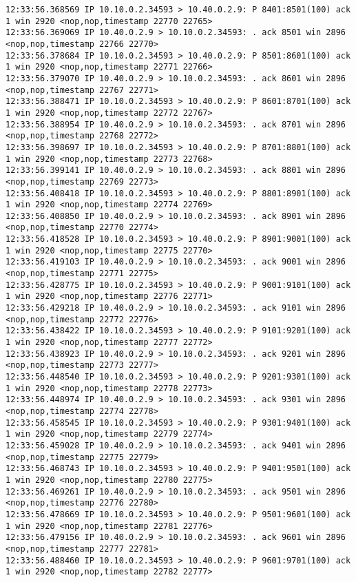 \documentclass[a4paper,12pt]{article}
\begin{document}
\begin{lstlisting}
12:33:56.368569 IP 10.10.0.2.34593 > 10.40.0.2.9: P 8401:8501(100) ack 1 win 2920 <nop,nop,timestamp 22770 22765>
12:33:56.369069 IP 10.40.0.2.9 > 10.10.0.2.34593: . ack 8501 win 2896 <nop,nop,timestamp 22766 22770>
12:33:56.378684 IP 10.10.0.2.34593 > 10.40.0.2.9: P 8501:8601(100) ack 1 win 2920 <nop,nop,timestamp 22771 22766>
12:33:56.379070 IP 10.40.0.2.9 > 10.10.0.2.34593: . ack 8601 win 2896 <nop,nop,timestamp 22767 22771>
12:33:56.388471 IP 10.10.0.2.34593 > 10.40.0.2.9: P 8601:8701(100) ack 1 win 2920 <nop,nop,timestamp 22772 22767>
12:33:56.388954 IP 10.40.0.2.9 > 10.10.0.2.34593: . ack 8701 win 2896 <nop,nop,timestamp 22768 22772>
12:33:56.398697 IP 10.10.0.2.34593 > 10.40.0.2.9: P 8701:8801(100) ack 1 win 2920 <nop,nop,timestamp 22773 22768>
12:33:56.399141 IP 10.40.0.2.9 > 10.10.0.2.34593: . ack 8801 win 2896 <nop,nop,timestamp 22769 22773>
12:33:56.408418 IP 10.10.0.2.34593 > 10.40.0.2.9: P 8801:8901(100) ack 1 win 2920 <nop,nop,timestamp 22774 22769>
12:33:56.408850 IP 10.40.0.2.9 > 10.10.0.2.34593: . ack 8901 win 2896 <nop,nop,timestamp 22770 22774>
12:33:56.418528 IP 10.10.0.2.34593 > 10.40.0.2.9: P 8901:9001(100) ack 1 win 2920 <nop,nop,timestamp 22775 22770>
12:33:56.419103 IP 10.40.0.2.9 > 10.10.0.2.34593: . ack 9001 win 2896 <nop,nop,timestamp 22771 22775>
12:33:56.428775 IP 10.10.0.2.34593 > 10.40.0.2.9: P 9001:9101(100) ack 1 win 2920 <nop,nop,timestamp 22776 22771>
12:33:56.429218 IP 10.40.0.2.9 > 10.10.0.2.34593: . ack 9101 win 2896 <nop,nop,timestamp 22772 22776>
12:33:56.438422 IP 10.10.0.2.34593 > 10.40.0.2.9: P 9101:9201(100) ack 1 win 2920 <nop,nop,timestamp 22777 22772>
12:33:56.438923 IP 10.40.0.2.9 > 10.10.0.2.34593: . ack 9201 win 2896 <nop,nop,timestamp 22773 22777>
12:33:56.448540 IP 10.10.0.2.34593 > 10.40.0.2.9: P 9201:9301(100) ack 1 win 2920 <nop,nop,timestamp 22778 22773>
12:33:56.448974 IP 10.40.0.2.9 > 10.10.0.2.34593: . ack 9301 win 2896 <nop,nop,timestamp 22774 22778>
12:33:56.458545 IP 10.10.0.2.34593 > 10.40.0.2.9: P 9301:9401(100) ack 1 win 2920 <nop,nop,timestamp 22779 22774>
12:33:56.459028 IP 10.40.0.2.9 > 10.10.0.2.34593: . ack 9401 win 2896 <nop,nop,timestamp 22775 22779>
12:33:56.468743 IP 10.10.0.2.34593 > 10.40.0.2.9: P 9401:9501(100) ack 1 win 2920 <nop,nop,timestamp 22780 22775>
12:33:56.469261 IP 10.40.0.2.9 > 10.10.0.2.34593: . ack 9501 win 2896 <nop,nop,timestamp 22776 22780>
12:33:56.478669 IP 10.10.0.2.34593 > 10.40.0.2.9: P 9501:9601(100) ack 1 win 2920 <nop,nop,timestamp 22781 22776>
12:33:56.479156 IP 10.40.0.2.9 > 10.10.0.2.34593: . ack 9601 win 2896 <nop,nop,timestamp 22777 22781>
12:33:56.488460 IP 10.10.0.2.34593 > 10.40.0.2.9: P 9601:9701(100) ack 1 win 2920 <nop,nop,timestamp 22782 22777>

\end{lstlisting}
\end{document}
